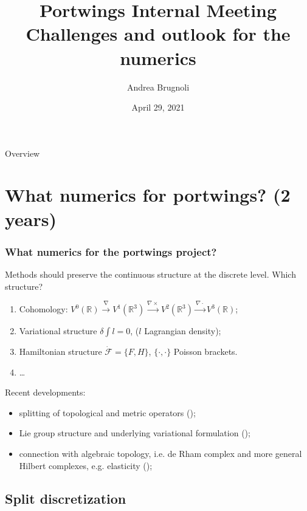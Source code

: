 \documentclass{beamer}
\title{Portwings Internal Meeting\\
Challenges and outlook for the numerics}
\author[A.~Brugnoli]{Andrea Brugnoli} %
\institute[UT]{Department of Robotics and Mechatronics,\\ University of Twente}
\date[29-04-2021]{April 29, 2021}
\newcommand{\bbR}{\mathbb{R}}
\begin{document}
\maketitle

\begin{frame}{Overview}
	\tableofcontents
\end{frame}

\section{What numerics for portwings? (2 years)}



\begin{frame}\frametitle{What numerics for the portwings project?}
Methods should preserve the continuous structure at the discrete level. Which structure? 
\begin{enumerate}
	\item Cohomology: $V^0(\bbR) \xrightarrow{\nabla} V^1(\bbR^3) \xrightarrow{\nabla \times} V^2(\bbR^3) \xrightarrow{\nabla \cdot} V^3(\bbR)$;
	\item Variational structure $\delta \int l = 0$, ($l$ Lagrangian density);
	\item Hamiltonian structure $\dot{\mathcal{F}} = \{F, H\}$, $\{\cdot, \cdot\}$ Poisson brackets.
	\item \dots
\end{enumerate}
\vspace{.1cm}
Recent developments:
\begin{itemize}
\item splitting of topological and metric operators (\cite{bauer2018split});
\item Lie group structure and underlying variational formulation (\cite{gawlik2020variational});
\item connection with algebraic topology, i.e. de Rham complex and more general Hilbert complexes, e.g. elasticity (\cite{bochev2006mimetic,arnold2006acta,palha2014compatible}); 
\end{itemize}

\end{frame}

\subsection{Split discretization}
\end{document}
